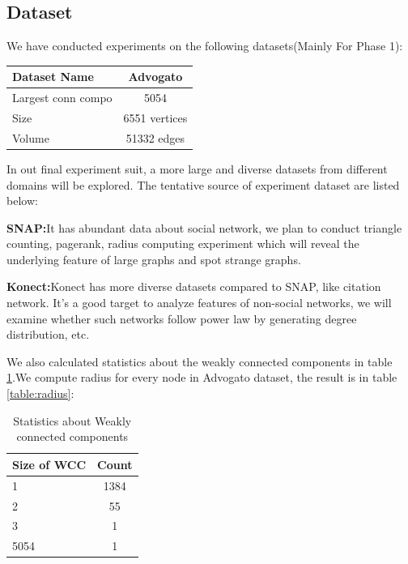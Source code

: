 \subsection{Dataset}
We have conducted experiments on the following datasets(Mainly For Phase 1):
\begin{center}
\begin{tabular}{| l | c |}
  \hline                        
  Dataset Name & Advogato  \\ \hline
  Largest conn compo & 5054  \\ \hline
  Size & 6551 vertices  \\ \hline
  Volume & 51332 edges \\ \hline
\end{tabular}
\end{center}

In out final experiment suit, a more large and diverse datasets from different domains will be explored. The tentative source of experiment dataset are listed below:
\begin{description}
	\item{{\bf SNAP:}}{It has abundant data about social network, we plan to conduct triangle counting, pagerank, radius computing experiment which will reveal the underlying feature of large graphs and spot strange graphs.}
	\item{{\bf Konect:}}{Konect has more diverse datasets compared to SNAP, like citation network. It's a good target to analyze features of non-social networks, we will examine whether such networks follow power law by generating degree distribution, etc.}
\end{description}

We also calculated statistics about the weakly connected components in table \ref{table:wcc}.We compute radius for every node in Advogato dataset, the result is in table \ref{table:radius}:



















\begin{table}
\begin{center}
\begin{tabular}{| l | c |}
  \hline                        
  Size of WCC & Count  \\ \hline
  1 & 1384  \\ \hline
  2 & 55  \\ \hline
  3 & 1 \\ \hline
  5054 & 1 \\ \hline  
\end{tabular}
\caption{Statistics about Weakly connected components}
\label{table:wcc}
\end{center}
\end{table}

